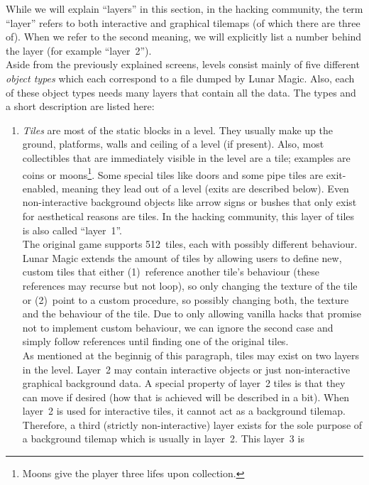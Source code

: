While we will explain ``layers'' in this section, in the hacking
community, the term ``layer'' refers to both interactive and graphical
tilemaps (of which there are three of). When we refer to the second
meaning, we will explicitly list a number behind the layer (for
example ``layer~2''). \\
Aside from the previously explained screens, levels consist mainly of
five different \emph{object types} which each correspond to a file
dumped by Lunar Magic. Also, each of these object types needs many
layers that contain all the data. The types and a short description
are listed here:
\begin{enumerate}
\item \emph{Tiles} are most of the static blocks in a level. They
  usually make up the ground, platforms, walls and ceiling of a level
  (if present). Also, most collectibles that are immediately visible
  in the level are a tile; examples are coins or moons\footnote{Moons
    give the player three lifes upon collection.}. Some special tiles
  like doors and some pipe tiles are exit-enabled, meaning they lead
  out of a level (exits are described below). Even non-interactive
  background objects like arrow signs or bushes that only exist for
  aesthetical reasons are tiles. In the hacking community, this layer
  of tiles is also called ``layer~1''. \\
  The original game supports 512~tiles, each with possibly different
  behaviour. Lunar Magic extends the amount of tiles by allowing users
  to define new, custom tiles that either (1)~reference another tile's
  behaviour (these references may recurse but not loop), so only
  changing the texture of the tile or (2)~point to a custom procedure,
  so possibly changing both, the texture and the behaviour of the
  tile. Due to only allowing vanilla hacks that promise not to
  implement custom behaviour, we can ignore the second case and simply
  follow references until finding one of the original tiles. \\
  As mentioned at the beginnig of this paragraph, tiles may exist on
  two layers in the level. Layer~2 may contain interactive objects or
  just non-interactive graphical background data. A special property
  of layer~2 tiles is that they can move if desired (how that is
  achieved will be described in a bit). When layer~2 is used for
  interactive tiles, it cannot act as a background tilemap. Therefore,
  a third (strictly non-interactive) layer exists for the sole purpose
  of a background tilemap which is usually in layer~2. This layer~3 is

\end{enumerate}
